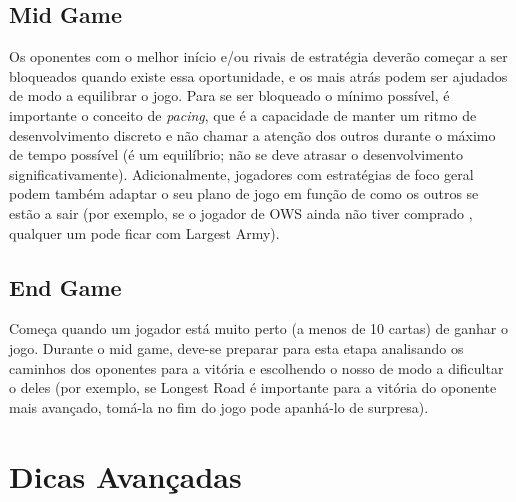 \documentclass[12pt]{article}
\begin{document}
\subsection{Mid Game}
Os oponentes com o melhor início e/ou rivais de estratégia deverão começar a ser bloqueados quando existe essa oportunidade, e os mais atrás podem ser ajudados de modo a equilibrar o jogo. 
Para se ser bloqueado o mínimo possível, é importante o conceito de \textit{pacing}, que é a capacidade de manter um ritmo de desenvolvimento discreto e não chamar a atenção dos outros durante o máximo de tempo possível (é um equilíbrio; não se deve atrasar o desenvolvimento significativamente).
Adicionalmente, jogadores com estratégias de foco geral podem também adaptar o seu plano de jogo em função de como os outros se estão a sair (por exemplo, se o jogador de OWS ainda não tiver comprado , qualquer um pode ficar com Largest Army).

\subsection{End Game}
Começa quando um jogador está muito perto (a menos de 10 cartas) de ganhar o jogo. 
Durante o mid game, deve-se preparar para esta etapa analisando os caminhos dos oponentes para a vitória e escolhendo o nosso de modo a dificultar o deles (por exemplo, se Longest Road é importante para a vitória do oponente mais avançado, tomá-la no fim do jogo pode apanhá-lo de surpresa).

\section{Dicas Avançadas}
\end{document}
